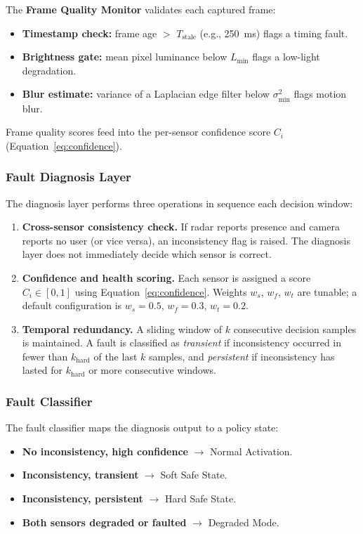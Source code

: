 \documentclass[12pt]{extarticle}
\begin{document}
The \textbf{Frame Quality Monitor} validates each captured frame:
\begin{itemize}
  \item \textbf{Timestamp check:} frame age $>$ $T_{\text{stale}}$ (e.g., 250~ms)
        flags a timing fault.
  \item \textbf{Brightness gate:} mean pixel luminance below $L_{\min}$ flags a
        low-light degradation.
  \item \textbf{Blur estimate:} variance of a Laplacian edge filter below
        $\sigma^2_{\min}$ flags motion blur.
\end{itemize}

Frame quality scores feed into the per-sensor confidence score $C_i$
(Equation~\ref{eq:confidence}).

\subsubsection{Fault Diagnosis Layer}

The diagnosis layer performs three operations in sequence each decision window:
\begin{enumerate}
  \item \textbf{Cross-sensor consistency check.}
        If radar reports presence and camera reports no user (or vice versa),
        an inconsistency flag is raised.
        The diagnosis layer does not immediately decide which sensor is correct.
  \item \textbf{Confidence and health scoring.}
        Each sensor is assigned a score $C_i \in [0, 1]$ using
        Equation~\ref{eq:confidence}.
        Weights $w_s$, $w_f$, $w_t$ are tunable; a default configuration is
        $w_s = 0.5$, $w_f = 0.3$, $w_t = 0.2$.
  \item \textbf{Temporal redundancy.}
        A sliding window of $k$ consecutive decision samples is maintained.
        A fault is classified as \emph{transient} if inconsistency occurred in fewer
        than $k_{\text{hard}}$ of the last $k$ samples, and \emph{persistent} if
        inconsistency has lasted for $k_{\text{hard}}$ or more consecutive windows.
\end{enumerate}

\subsubsection{Fault Classifier}

The fault classifier maps the diagnosis output to a policy state:
\begin{itemize}
  \item \textbf{No inconsistency, high confidence} $\to$ Normal Activation.
  \item \textbf{Inconsistency, transient} $\to$ Soft Safe State.
  \item \textbf{Inconsistency, persistent} $\to$ Hard Safe State.
  \item \textbf{Both sensors degraded or faulted} $\to$ Degraded Mode.
\end{itemize}
\end{document}
